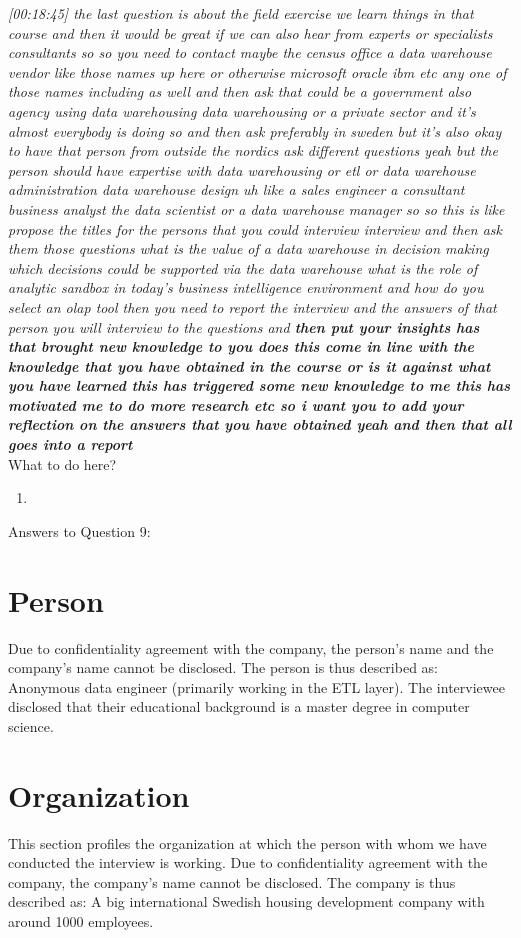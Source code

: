 \emph{[00:18:45] the last question is about the field exercise we learn things in that course and then
it would be great if we can also hear from experts or specialists consultants so so you need to contact
maybe the census office a data warehouse vendor like those names up here or otherwise microsoft oracle ibm etc any
one of those names including as well and then ask that could be a government also agency using
data warehousing data warehousing or a private sector and it's almost everybody is doing so and then ask
preferably in sweden but it's also okay to have that person from outside the nordics ask different
questions yeah but the person should have expertise with data warehousing or etl or data warehouse
administration data warehouse design uh like a sales engineer a consultant business analyst the data
scientist or a data warehouse manager so so this is like propose the titles for the persons that you could interview
interview and then ask them those questions what is the value of a data warehouse in decision making
which decisions could be supported via the data warehouse what is the role of analytic sandbox in
today's business intelligence environment and how do you select an olap tool then you need to report
the interview and the answers of that person you will interview to the questions and \textbf{then put your
insights has that brought new knowledge to you does this come in line with the knowledge that you have
obtained in the course or is it against what you have learned this has triggered some new knowledge to me
this has motivated me to do more research etc so i want you to add your reflection on the answers that
you have obtained yeah and then that all goes into a report}}\\

What to do here?
\begin{enumerate}
    \item 
  \end{enumerate}


\newpage Answers to Question 9:
\section{Person}
Due to confidentiality agreement with the company, the person's name and the company's name cannot be disclosed. The person is thus described as:
Anonymous data engineer (primarily working in the ETL layer). The interviewee disclosed that their educational background is a master degree in computer science.

\section{Organization}
This section profiles the organization at which the person with whom we have conducted the interview is working. 
Due to confidentiality agreement with the company, the company's name cannot be disclosed. The company is thus described as:
A big international Swedish housing development company with around 1000 employees.
